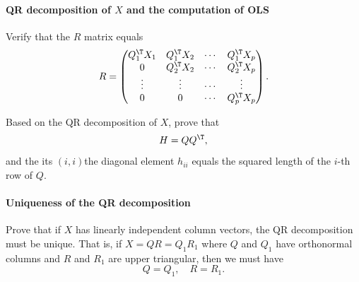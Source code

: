  \paragraph{QR decomposition of $X$ and the computation of OLS}\label{hw3::ols-qr-decomposition}
 
Verify that the $R$ matrix equals 
 $$
R = 
\begin{pmatrix}
Q_1^{\T} X_1 & Q_1^{\T} X_2 & \cdots &  Q_1^{\T} X_p  \\
0 & Q_2^{\T} X_2& \cdots &  Q_2^{\T} X_p  \\
\vdots & \vdots &  \cdots &  \vdots \\
0&0& \cdots & Q_p^{\T} X_p
\end{pmatrix}.
$$

Based on the QR decomposition of $X$, prove that 
$$
H = QQ^{\T},
$$ 
and the its $(i,i)$the diagonal element $h_{ii}$ equals the squared length of the $i$-th row of $Q$. 




 \paragraph{Uniqueness of the QR decomposition}\label{hw6::uniqueQR}
 
 Prove that if $X$ has linearly independent column vectors, the QR decomposition must be unique. That is, if $X = QR = Q_1 R_1$ where $Q$ and $Q_1$ have orthonormal columns and $R$ and $R_1$ are upper triangular, then we must have
 $$
 Q = Q_1,\quad  R = R_1.
 $$
 

